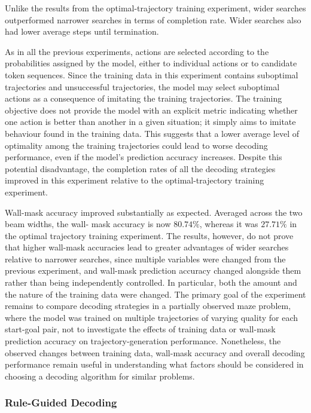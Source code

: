 ﻿\documentclass[12pt,a4paper]{article}
\theoremstyle{definition}
\begin{document}
Unlike the results from the optimal-trajectory training experiment, wider searches
outperformed narrower searches in terms of completion rate. Wider searches also had lower
average steps until termination.

As in all the previous experiments, actions are selected according to the probabilities
 assigned by the model, either to individual actions or to candidate token sequences. Since the training data in this experiment contains suboptimal trajectories
and unsuccessful trajectories, the model may select suboptimal actions as a consequence of imitating
the training trajectories. The training objective does not provide the model with an explicit 
metric indicating whether one action is better than another in a given situation; it simply 
aims to imitate behaviour
found in the training data. This suggests that a lower average level of optimality among the 
training trajectories could lead to worse decoding performance, even if the model’s 
prediction accuracy increases.
Despite this potential disadvantage, the completion rates of all the decoding strategies
improved in this experiment relative to the optimal-trajectory training experiment.

Wall-mask accuracy improved substantially as expected. Averaged across the two beam widths, the wall-
mask accuracy is now $80.74\%$, whereas it was $27.71\%$ in the optimal trajectory training experiment. 
The results, however,
do not prove that higher
wall-mask accuracies lead to greater advantages of wider searches relative to narrower searches, since
multiple variables were changed from the previous experiment, and wall-mask prediction
accuracy changed alongside them rather than being independently controlled. In particular, both
the amount and the nature of the training data were changed. The primary
goal of the experiment remains to compare decoding strategies in a partially observed maze problem, where the model
was trained on multiple trajectories of varying quality for each start-goal pair, not to investigate the
effects of training data or wall-mask prediction accuracy on trajectory-generation performance.
Nonetheless, the observed changes between training data, wall-mask accuracy and overall decoding performance
remain useful in understanding what factors should be considered in choosing a decoding algorithm
for similar problems. 


\subsubsection{Rule-Guided Decoding}
\end{document}

